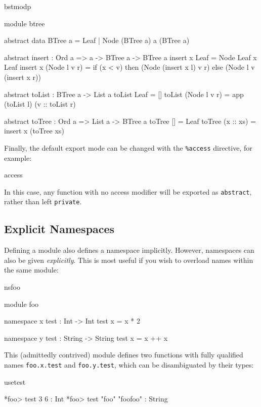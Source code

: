 \begin{SaveVerbatim}{bstmodp}

module btree

abstract data BTree a = Leaf
                      | Node (BTree a) a (BTree a)

abstract
insert : Ord a => a -> BTree a -> BTree a
insert x Leaf = Node Leaf x Leaf
insert x (Node l v r) = if (x < v) then (Node (insert x l) v r)
                                   else (Node l v (insert x r))

abstract
toList : BTree a -> List a
toList Leaf = []
toList (Node l v r) = app (toList l) (v :: toList r)

abstract
toTree : Ord a => List a -> BTree a
toTree [] = Leaf
toTree (x :: xs) = insert x (toTree xs)

\end{SaveVerbatim}

\noindent
Finally, the default export mode can be changed with the \texttt{\%access} directive,
for example:

\begin{SaveVerbatim}{access}


\end{SaveVerbatim}

\noindent
In this case, any function with no access modifier will be exported as \texttt{abstract},
rather than left \texttt{private}.

\subsection{Explicit Namespaces}

Defining a module also defines a namespace implicitly. However, namespaces can also
be given \emph{explicitly}. This is most useful if you wish to overload names within
the same module:

\begin{SaveVerbatim}{nsfoo}

module foo

namespace x {
  test : Int -> Int
  test x = x * 2
}

namespace y {
  test : String -> String
  test x = x ++ x 
}

\end{SaveVerbatim}

\noindent
This (admittedly contrived) module defines two functions with fully qualified names
\texttt{foo.x.test} and \texttt{foo.y.test}, which can be disambiguated by their
types:

\begin{SaveVerbatim}{usetest}

*foo> test 3 
6 : Int
*foo> test "foo" 
"foofoo" : String

\end{SaveVerbatim}

